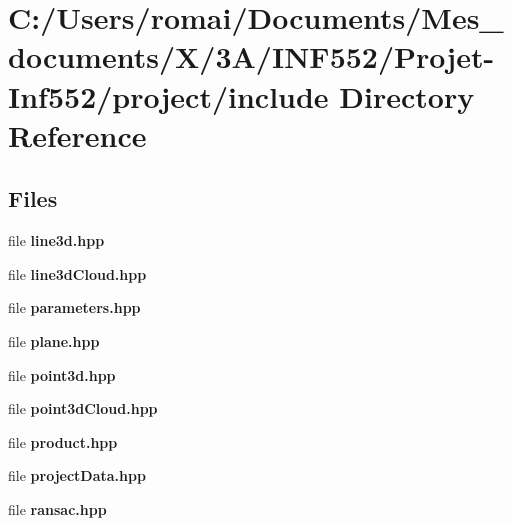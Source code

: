\section{C\+:/\+Users/romai/\+Documents/\+Mes\+\_\+documents/\+X/3\+A/\+I\+N\+F552/\+Projet-\/\+Inf552/project/include Directory Reference}
\label{dir_2d63037d3c90bbd3001cbce1db844cde}
\subsection*{Files}
\begin{DoxyCompactItemize}
\item 
file \textbf{ line3d.\+hpp}
\item 
file \textbf{ line3d\+Cloud.\+hpp}
\item 
file \textbf{ parameters.\+hpp}
\item 
file \textbf{ plane.\+hpp}
\item 
file \textbf{ point3d.\+hpp}
\item 
file \textbf{ point3d\+Cloud.\+hpp}
\item 
file \textbf{ product.\+hpp}
\item 
file \textbf{ project\+Data.\+hpp}
\item 
file \textbf{ ransac.\+hpp}
\end{DoxyCompactItemize}
